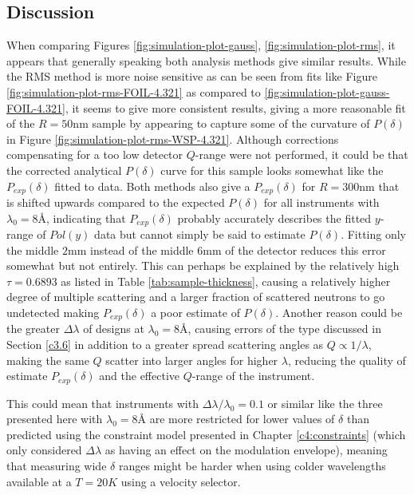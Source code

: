 \documentclass{article}
\begin{document}
\subsection{Discussion}
When comparing Figures \ref{fig:simulation-plot-gauss}, \ref{fig:simulation-plot-rms}, it appears that generally speaking both analysis methods give similar results. While the RMS method is more noise sensitive as can be seen from fits like Figure \ref{fig:simulation-plot-rms-FOIL-4.321} as compared to \ref{fig:simulation-plot-gauss-FOIL-4.321}, it seems to give more consistent results, giving a more reasonable fit of the $R=50\unit{\nano\meter}$ sample by appearing to capture some of the curvature of $P(\delta)$ in Figure \ref{fig:simulation-plot-rms-WSP-4.321}. Although corrections compensating for a too low detector $Q$-range \cite{kusmin2017} were not performed, it could be that the corrected analytical $P(\delta)$ curve for this sample looks somewhat like the $P_{exp}(\delta)$ fitted to data. Both methods also give a $P_{exp}(\delta)$ for $R = 300 \unit{\nano\meter}$ that is shifted upwards compared to the expected $P(\delta)$ for all instruments with $\lambda_0 = 8$Å, indicating that $P_{exp}(\delta)$ probably accurately describes the fitted $y$-range of $Pol(y)$ data but cannot simply be said to estimate $P(\delta)$. Fitting only the middle $2\unit{\milli\meter}$ instead of the middle $6\unit{\milli\meter}$ of the detector reduces this error somewhat but not entirely. This can perhaps be explained by the relatively high $\tau = 0.6893$ as listed in Table \ref{tab:sample-thickness}, causing a relatively higher degree of multiple scattering and a larger fraction of scattered neutrons to go undetected making $P_{exp}(\delta)$ a poor estimate of $P(\delta)$. Another reason could be the greater $\Delta\lambda$ of designs at $\lambda_0 = 8$Å, causing errors of the type discussed in Section \ref{c3.6} in addition to a greater spread scattering angles as $Q\propto 1/\lambda$, making the same $Q$ scatter into larger angles for higher $\lambda$, reducing the quality of estimate $P_{exp}(\delta)$ and the effective $Q$-range of the instrument.

This could mean that instruments with $\Delta\lambda/\lambda_0 = 0.1$ or similar like the three presented here with $\lambda_0 = 8$Å are more restricted for lower values of $\delta$ than predicted using the constraint model presented in Chapter \ref{c4:constraints} (which only considered $\Delta\lambda$ as having an effect on the modulation envelope), meaning that measuring wide $\delta$ ranges might be harder when using colder wavelengths available at a $T=20K$ using a velocity selector. 
\end{document}

